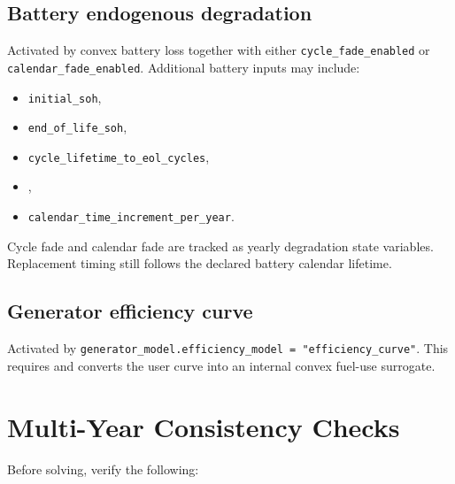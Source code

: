 \documentclass[11pt,a4paper]{report}
\newcommand{\code}[1]{\texttt{#1}}
\begin{document}
\section{Battery endogenous degradation}

Activated by convex battery loss together with either \code{cycle\_fade\_enabled} or \code{calendar\_fade\_enabled}. Additional battery inputs may include:

\begin{itemize}[leftmargin=1.5em]
  \item \code{initial\_soh},
  \item \code{end\_of\_life\_soh},
  \item \code{cycle\_lifetime\_to\_eol\_cycles},
  \item {},
  \item \code{calendar\_time\_increment\_per\_year}.
\end{itemize}

Cycle fade and calendar fade are tracked as yearly degradation state variables. Replacement timing still follows the declared battery calendar lifetime.

\section{Generator efficiency curve}

Activated by \code{generator\_model.efficiency\_model = "efficiency\_curve"}. This requires  and converts the user curve into an internal convex fuel-use surrogate.

\chapter{Multi-Year Consistency Checks}\label{sec:multi-year-checks}

Before solving, verify the following:
\end{document}
